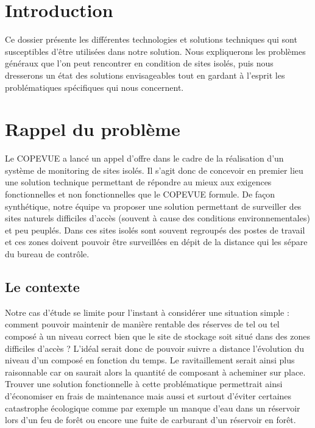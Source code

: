 \section{Introduction}

Ce dossier présente les différentes technologies et solutions techniques qui sont susceptibles d’être utilisées dans notre solution. Nous expliquerons les problèmes généraux que l’on peut rencontrer en condition de sites isolés, puis nous dresserons un état des solutions envisageables tout en gardant à l'esprit les problématiques spécifiques qui nous concernent.

\section{Rappel du problème}

Le COPEVUE a lancé un appel d'offre dans le cadre de la réalisation d'un système de monitoring de sites isolés. Il s'agit donc de concevoir en premier lieu une solution technique permettant de répondre au mieux aux exigences fonctionnelles et non fonctionnelles que le COPEVUE formule. De façon synthétique, notre équipe va proposer une solution permettant de surveiller des sites naturels difficiles d'accès (souvent à cause des conditions environnementales) et peu peuplés. Dans ces sites isolés sont souvent regroupés des postes de travail et ces zones doivent pouvoir être surveillées en dépit de la distance qui les sépare du bureau de contrôle.

\subsection{Le contexte}

Notre cas d'étude se limite pour l'instant à considérer une situation simple : comment pouvoir maintenir de manière rentable des réserves de tel ou tel composé à un niveau correct bien que le site de stockage soit situé dans des zones difficiles d'accès ? L'idéal serait donc de pouvoir suivre a distance l'évolution du niveau d'un composé en fonction du temps. Le ravitaillement serait ainsi plus raisonnable car on saurait alors la quantité de composant à acheminer sur place. Trouver une solution fonctionnelle à cette problématique permettrait ainsi d'économiser en frais de maintenance mais aussi et surtout d'éviter certaines catastrophe écologique comme par exemple un manque d'eau dans un réservoir lors d'un feu de forêt ou encore une fuite de carburant d'un réservoir en forêt.

